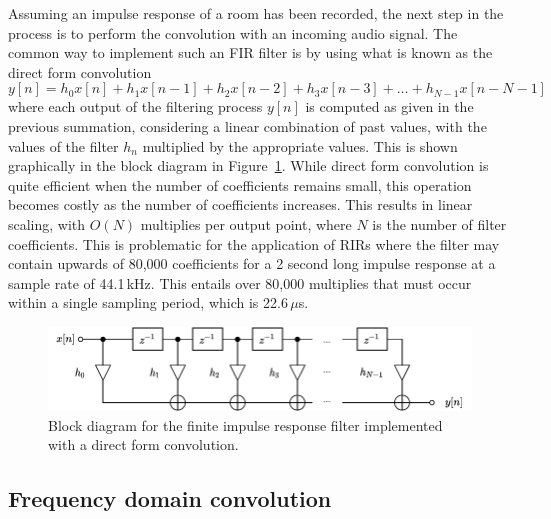 \documentclass{article}
\begin{document}
Assuming an impulse response of a room has been recorded, the next step in the process is to perform the convolution with an incoming audio signal. 
The common way to implement such an FIR filter is by using what is known as the direct form convolution
\begin{equation*}
    y[n] = h_0 x[n] + h_1 x[n-1] + h_2 x[n-2] + h_3 x[n-3] + \dots + h_{N-1} x[n-N-1]
\end{equation*}
where each output of the filtering process $y[n]$ is computed as given in the previous summation, 
considering a linear combination of past values, with the values of the filter $h_n$ multiplied by the appropriate values. 
This is shown graphically in the block diagram in Figure~\ref{fig:direct}. 
While direct form convolution is quite efficient when the number of coefficients remains small, 
this operation becomes costly as the number of coefficients increases. 
This results in linear scaling, with $O(N)$ multiplies per output point, where $N$ is the number of filter coefficients. 
This is problematic for the application of RIRs where the filter may contain upwards of 
80,000 coefficients for a 2 second long impulse response at a sample rate of 44.1\,kHz. 
This entails over 80,000 multiplies that must occur within a single sampling period, which is 22.6\,$\mu$s.

\begin{figure}
    \centering
    \includegraphics[width=0.7\linewidth]{figures/direct.pdf}
    \caption{Block diagram for the finite impulse response filter implemented with a direct form convolution.}
    \label{fig:direct}
\end{figure}

\subsection{Frequency domain convolution}
\end{document}
